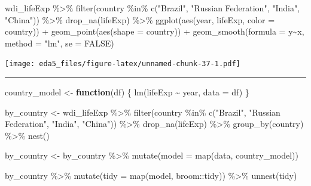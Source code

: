 \documentclass[
]{article}
\newenvironment{Shaded}{\begin{snugshade}}{\end{snugshade}}
\newcommand{\AttributeTok}[1]{\textcolor[rgb]{0.77,0.63,0.00}{#1}}
\newcommand{\ConstantTok}[1]{\textcolor[rgb]{0.00,0.00,0.00}{#1}}
\newcommand{\ControlFlowTok}[1]{\textcolor[rgb]{0.13,0.29,0.53}{\textbf{#1}}}
\newcommand{\FunctionTok}[1]{\textcolor[rgb]{0.00,0.00,0.00}{#1}}
\newcommand{\NormalTok}[1]{#1}
\newcommand{\OtherTok}[1]{\textcolor[rgb]{0.56,0.35,0.01}{#1}}
\newcommand{\SpecialCharTok}[1]{\textcolor[rgb]{0.00,0.00,0.00}{#1}}
\newcommand{\StringTok}[1]{\textcolor[rgb]{0.31,0.60,0.02}{#1}}
\begin{document}
\begin{Shaded}
\begin{Highlighting}[]
\NormalTok{wdi\_lifeExp }\SpecialCharTok{\%\textgreater{}\%} \FunctionTok{filter}\NormalTok{(country }\SpecialCharTok{\%in\%} \FunctionTok{c}\NormalTok{(}\StringTok{"Brazil"}\NormalTok{, }\StringTok{"Russian Federation"}\NormalTok{, }\StringTok{"India"}\NormalTok{, }\StringTok{"China"}\NormalTok{)) }\SpecialCharTok{\%\textgreater{}\%} \FunctionTok{drop\_na}\NormalTok{(lifeExp) }\SpecialCharTok{\%\textgreater{}\%}
  \FunctionTok{ggplot}\NormalTok{(}\FunctionTok{aes}\NormalTok{(year, lifeExp, }\AttributeTok{color =}\NormalTok{ country)) }\SpecialCharTok{+} \FunctionTok{geom\_point}\NormalTok{(}\FunctionTok{aes}\NormalTok{(}\AttributeTok{shape =}\NormalTok{ country)) }\SpecialCharTok{+} \FunctionTok{geom\_smooth}\NormalTok{(}\AttributeTok{formula =}\NormalTok{ y}\SpecialCharTok{\textasciitilde{}}\NormalTok{x, }\AttributeTok{method =} \StringTok{"lm"}\NormalTok{, }\AttributeTok{se =} \ConstantTok{FALSE}\NormalTok{)}
\end{Highlighting}
\end{Shaded}

\texttt{[image: eda5\_files/figure-latex/unnamed-chunk-37-1.pdf]}

\begin{center}\rule{0.5\linewidth}{0.5pt}\end{center}

\begin{Shaded}
\begin{Highlighting}[]
\NormalTok{country\_model }\OtherTok{\textless{}{-}} \ControlFlowTok{function}\NormalTok{(df) \{}
  \FunctionTok{lm}\NormalTok{(lifeExp }\SpecialCharTok{\textasciitilde{}}\NormalTok{ year, }\AttributeTok{data =}\NormalTok{ df)}
\NormalTok{\}}

\NormalTok{by\_country }\OtherTok{\textless{}{-}}\NormalTok{ wdi\_lifeExp }\SpecialCharTok{\%\textgreater{}\%} \FunctionTok{filter}\NormalTok{(country }\SpecialCharTok{\%in\%} \FunctionTok{c}\NormalTok{(}\StringTok{"Brazil"}\NormalTok{, }\StringTok{"Russian Federation"}\NormalTok{, }\StringTok{"India"}\NormalTok{, }\StringTok{"China"}\NormalTok{)) }\SpecialCharTok{\%\textgreater{}\%} \FunctionTok{drop\_na}\NormalTok{(lifeExp) }\SpecialCharTok{\%\textgreater{}\%} \FunctionTok{group\_by}\NormalTok{(country) }\SpecialCharTok{\%\textgreater{}\%} \FunctionTok{nest}\NormalTok{()}

\NormalTok{by\_country }\OtherTok{\textless{}{-}}\NormalTok{ by\_country }\SpecialCharTok{\%\textgreater{}\%} 
  \FunctionTok{mutate}\NormalTok{(}\AttributeTok{model =} \FunctionTok{map}\NormalTok{(data, country\_model))}

\NormalTok{by\_country }\SpecialCharTok{\%\textgreater{}\%} 
  \FunctionTok{mutate}\NormalTok{(}\AttributeTok{tidy =} \FunctionTok{map}\NormalTok{(model, broom}\SpecialCharTok{::}\NormalTok{tidy)) }\SpecialCharTok{\%\textgreater{}\%} 
  \FunctionTok{unnest}\NormalTok{(tidy)}
\end{Highlighting}
\end{Shaded}
\end{document}
